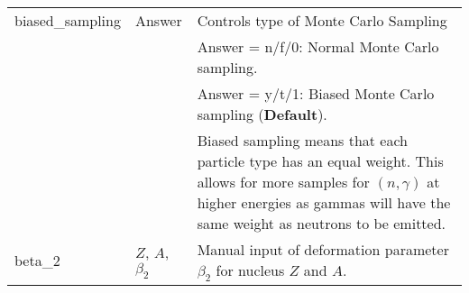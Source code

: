 \documentclass[
10pt,
showpacs,preprintnumbers,nofootinbib,
amsmath,amssymb,
aps,prc,groupedaddress,superscriptaddress,
notitlepage,showkeys
]{revtex4-1}
\begin{document}
\begin{center}
\begin{tabular}{| p{4cm} | p{4 cm} | p{9 cm} |}
\hline
biased\_sampling & Answer  & Controls type of Monte Carlo Sampling \\
& & Answer = n/f/0: Normal Monte Carlo sampling.\\  
& & Answer = y/t/1: Biased Monte Carlo sampling ({\bf Default}).\\
& & Biased sampling means that each particle type has an equal weight. This allows for more samples for $(n,\gamma)$ at higher energies as gammas will have the same weight as neutrons to be emitted.\\
\hline
beta\_2   & $Z$,  $A$,   $\beta_2$ &
          Manual input of deformation parameter $\beta_2$ for nucleus $Z$ and $A$.\\
\hline
\end{tabular}
\end{center}
%
%
\end{document}

